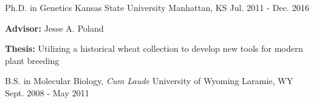 
\begin{cventries}

  \cventry
    {Ph.D. in Genetics} %
    {Kansas State University} %
    {Manhattan, KS} %
    {Jul. 2011 - Dec. 2016} %
    {
      \begin{cvitems} %
        \item {\textbf{Advisor:} Jesse A. Poland}
        \item {\textbf{Thesis:} Utilizing a historical wheat collection to develop new tools for modern plant breeding}
      \end{cvitems}
    }

  \cventry
    {B.S. in Molecular Biology, \textit{Cum Laude}} %
    {University of Wyoming} %
    {Laramie, WY} %
    {Sept. 2008 - May 2011} %
    {}
    
\end{cventries}